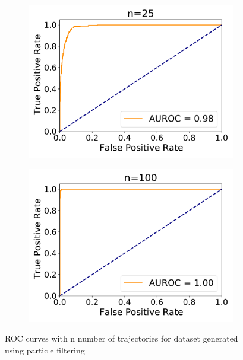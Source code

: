 \begin{figure}[htb]
\begin{subfigure}{.33\textwidth}
		\includegraphics[width=1\linewidth]{figures/roc_particleFilter/AUROC_2000samples_class0_llh_n25}
		\caption{}
		\label{fig:roc_part_n25}
	\end{subfigure}
	\begin{subfigure}{.33\textwidth}
		\centering
		\includegraphics[width=1\linewidth]{figures/roc_particleFilter/AUROC_2000samples_class0_llh_n100}
		\caption{}
		\label{fig:roc_part_n100}
	\end{subfigure}
	\caption{ROC curves with n number of trajectories for dataset generated using particle filtering}
	\label{fig:roc_part}
\end{figure}